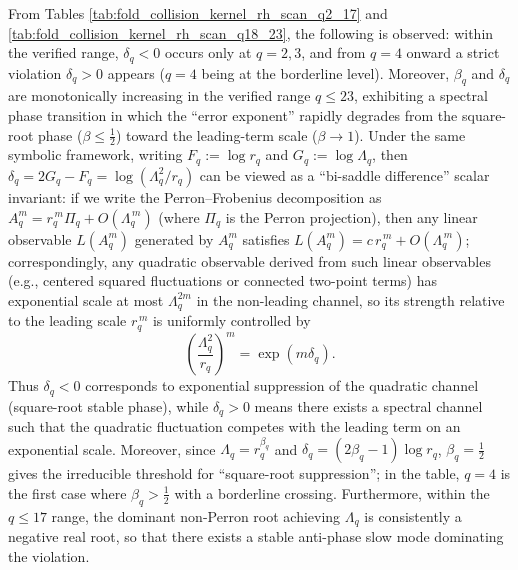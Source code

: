 \begin{remark}[Systematic violation starting from \texorpdfstring{$q=4$}{q=4} and rapid degradation]\label{rem:pom-collision-kernel-rh-phase}
From Tables \ref{tab:fold_collision_kernel_rh_scan_q2_17} and \ref{tab:fold_collision_kernel_rh_scan_q18_23}, the following is observed: within the verified range, \(\delta_q<0\) occurs only at \(q=2,3\), and from \(q=4\) onward a strict violation \(\delta_q>0\) appears (\(q=4\) being at the borderline level).
Moreover, \(\beta_q\) and \(\delta_q\) are monotonically increasing in the verified range \(q\le 23\), exhibiting a spectral phase transition in which the ``error exponent'' rapidly degrades from the square-root phase (\(\beta\le\frac12\)) toward the leading-term scale (\(\beta\to 1\)).
Under the same symbolic framework, writing \(F_q:=\log r_q\) and \(G_q:=\log\Lambda_q\), then
\(\delta_q=2G_q-F_q=\log(\Lambda_q^2/r_q)\) can be viewed as a ``bi-saddle difference'' scalar invariant: if we write the Perron--Frobenius decomposition as
\(
A_q^m=r_q^{\,m}\Pi_q+O(\Lambda_q^{\,m})
\)
(where \(\Pi_q\) is the Perron projection), then any linear observable \(L(A_q^m)\) generated by \(A_q^m\) satisfies
\(
L(A_q^m)=c\,r_q^{\,m}+O(\Lambda_q^{\,m})
\);
correspondingly, any quadratic observable derived from such linear observables (e.g., centered squared fluctuations or connected two-point terms) has exponential scale at most \(\Lambda_q^{2m}\) in the non-leading channel, so its strength relative to the leading scale \(r_q^{\,m}\) is uniformly controlled by
\[
\left(\frac{\Lambda_q^2}{r_q}\right)^{m}=\exp(m\delta_q).
\]
Thus \(\delta_q<0\) corresponds to exponential suppression of the quadratic channel (square-root stable phase), while \(\delta_q>0\) means there exists a spectral channel such that the quadratic fluctuation competes with the leading term on an exponential scale.
Moreover, since \(\Lambda_q=r_q^{\beta_q}\) and \(\delta_q=(2\beta_q-1)\log r_q\), \(\beta_q=\tfrac12\) gives the irreducible threshold for ``square-root suppression''; in the table, \(q=4\) is the first case where \(\beta_q>\tfrac12\) with a borderline crossing.
Furthermore, within the \(q\le 17\) range, the dominant non-Perron root achieving \(\Lambda_q\) is consistently a negative real root, so that there exists a stable anti-phase slow mode dominating the violation.
\end{remark}

